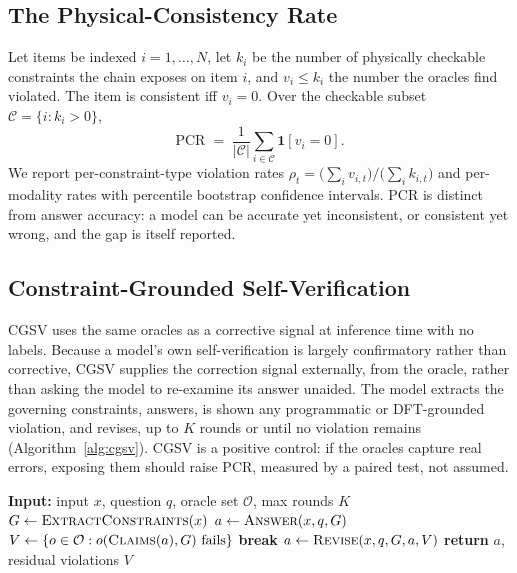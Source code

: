 \documentclass[pdflatex,sn-nature]{sn-jnl}
\begin{document}
\subsection*{The Physical-Consistency Rate}
Let items be indexed $i=1,\dots,N$, let $k_i$ be the number of physically checkable
constraints the chain exposes on item $i$, and $v_i \le k_i$ the number the oracles
find violated. The item is consistent iff $v_i=0$. Over the checkable subset
$\mathcal{C}=\{i:k_i>0\}$,
\begin{equation}
\mathrm{PCR} \;=\; \frac{1}{|\mathcal{C}|}\sum_{i\in\mathcal{C}} \mathbf{1}[v_i = 0].
\end{equation}
We report per-constraint-type violation rates
$\rho_t=\big(\sum_i v_{i,t}\big)/\big(\sum_i k_{i,t}\big)$ and per-modality rates with
percentile bootstrap confidence intervals. PCR is distinct from answer accuracy: a
model can be accurate yet inconsistent, or consistent yet wrong, and the gap is
itself reported.

\subsection*{Constraint-Grounded Self-Verification}
CGSV uses the same oracles as a corrective signal at inference time with no labels.
Because a model's own self-verification is largely confirmatory rather than
corrective,\cite{selfverify2026} CGSV supplies the correction signal externally, from the
oracle, rather than asking the model to re-examine its answer unaided. The model extracts
the governing constraints, answers, is shown any programmatic or DFT-grounded violation,
and revises, up to $K$ rounds or until no violation remains (Algorithm~\ref{alg:cgsv}).
CGSV is a positive control: if the oracles capture real errors, exposing them should raise
PCR, measured by a paired test, not assumed.

\begin{algorithm}[t]
\caption{Constraint-Grounded Self-Verification}
\label{alg:cgsv}
\begin{algorithmic}[1]
\State \textbf{Input:} input $x$, question $q$, oracle set $\mathcal{O}$, max rounds $K$
\State $G \gets \textsc{ExtractConstraints}(x)$
\State $a \gets \textsc{Answer}(x,q,G)$
  \State $V \gets \{o \in \mathcal{O} : o(\textsc{Claims}(a), G)\ \text{fails}\}$
   \State \textbf{break} \EndIf
  \State $a \gets \textsc{Revise}(x, q, G, a, V)$
\EndFor
\State \textbf{return} $a$, residual violations $V$
\end{algorithmic}
\end{algorithm}
\end{document}
